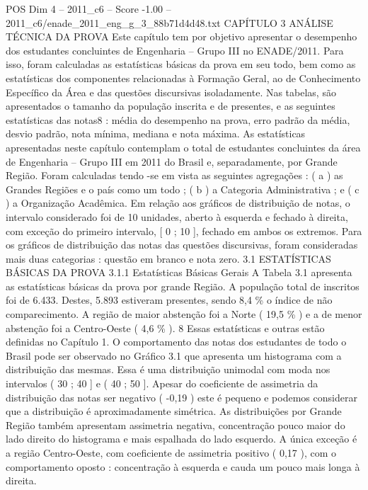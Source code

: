 \begin{textsample}{POS Dim 4 – 2011\_c6 – Score -1.00 – 2011\_c6/enade\_2011\_eng\_g\_3\_88b71d4d48.txt}  \label{ex:f4_pos_308}
CAPÍTULO 3 ANÁLISE TÉCNICA DA PROVA Este capítulo tem por objetivo apresentar o desempenho dos estudantes concluintes de Engenharia – Grupo III no ENADE/2011.
Para isso, foram calculadas as estatísticas básicas da prova em seu todo, bem como as estatísticas dos componentes relacionadas à Formação Geral, ao de Conhecimento Específico da Área e das questões discursivas isoladamente.
Nas tabelas, são apresentados o tamanho da população inscrita e de presentes, e as seguintes estatísticas das notas8 : média do desempenho na prova, erro padrão da média, desvio padrão, nota mínima, mediana e nota máxima.
As estatísticas apresentadas neste capítulo contemplam o total de estudantes concluintes da área de Engenharia – Grupo III em 2011 do Brasil e, separadamente, por Grande Região.
Foram calculadas tendo -se em vista as seguintes agregações : ( a ) as Grandes Regiões e o país como um todo ; ( b ) a Categoria Administrativa ; e ( c ) a Organização Acadêmica.
Em relação aos gráficos de distribuição de notas, o intervalo considerado foi de 10 unidades, aberto à esquerda e fechado à direita, com exceção do primeiro intervalo, [ 0 ; 10 ], fechado em ambos os extremos.
Para os gráficos de distribuição das notas das questões discursivas, foram consideradas mais duas categorias : questão em branco e nota zero. 3.1 ESTATÍSTICAS BÁSICAS DA PROVA 3.1.1 Estatísticas Básicas Gerais A Tabela 3.1 apresenta as estatísticas básicas da prova por grande Região.
A população total de inscritos foi de 6.433.
Destes, 5.893 estiveram presentes, sendo 8,4 \% o índice de não comparecimento.
A região de maior abstenção foi a Norte ( 19,5 \% ) e a de menor abstenção foi a Centro-Oeste ( 4,6 \% ). 8 Essas estatísticas e outras estão definidas no Capítulo 1.
O comportamento das notas dos estudantes de todo o Brasil pode ser observado no Gráfico 3.1 que apresenta um histograma com a distribuição das mesmas.
Essa é uma distribuição unimodal com moda nos intervalos ( 30 ; 40 ] e ( 40 ; 50 ].
Apesar do coeficiente de assimetria da distribuição das notas ser negativo ( -0,19 ) este é pequeno e podemos considerar que a distribuição é aproximadamente simétrica.
As distribuições por Grande Região também apresentam assimetria negativa, concentração pouco maior do lado direito do histograma e mais espalhada do lado esquerdo.
A única exceção é a região Centro-Oeste, com coeficiente de assimetria positivo ( 0,17 ), com o comportamento oposto : concentração à esquerda e cauda um pouco mais longa à direita.

\end{textsample}
